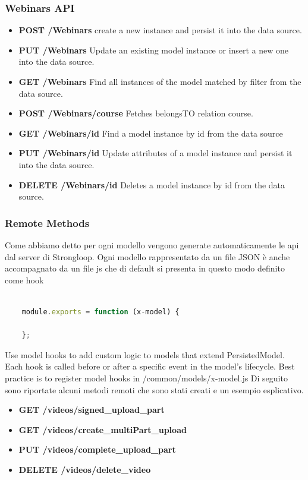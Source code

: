 \subsubsection{Webinars API}
\begin{itemize}
\item \textbf{POST /Webinars} create a new instance and persist it into the data source.
\item \textbf{PUT /Webinars} Update an existing model instance or insert a new one into the data source.
\item \textbf{GET /Webinars} Find all instances of the model matched by filter from the  data source.
\item \textbf{POST /Webinars/course} Fetches belongsTO relation course.
\item \textbf{GET /Webinars/id} Find a model instance by id from the data source
\item \textbf{PUT /Webinars/id} Update attributes of a model instance and persist it into the data source.
\item \textbf{DELETE /Webinars/id} Deletes a model instance by id from the data 
source.
\end{itemize}

 \subsubsection{ Remote Methods }
  
  Come abbiamo detto per ogni modello vengono generate automaticamente le api dal server di Strongloop. Ogni modello rappresentato da un file JSON è anche accompagnato da un file js che di default si presenta in questo modo definito come hook
  \begin{lstlisting}[language=javascript]

    module.exports = function (x-model) {
    
    };
  \end{lstlisting}


Use model hooks to add custom logic to models that extend PersistedModel. Each hook is called before or after a specific event in the model's lifecycle.
Best practice is to register model hooks in /common/models/x-model.js
Di seguito sono riportate alcuni metodi remoti che sono stati creati e un esempio esplicativo.

\begin{itemize}
\item \textbf{GET /videos/signed\_upload\_part }
\item \textbf{GET /videos/create\_multiPart\_upload}
\item \textbf{PUT /videos/complete\_upload\_part }
\item \textbf{DELETE /videos/delete\_video}
\end{itemize}

